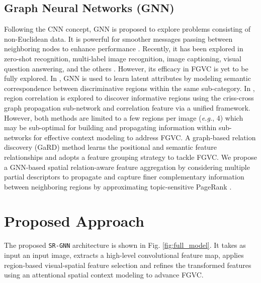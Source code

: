 \documentclass[journal]{IEEEtran}
\begin{document}
\subsection {Graph Neural Networks (GNN)} 
Following the CNN concept, GNN is proposed to explore problems consisting of non-Euclidean data. It is powerful for smoother messages passing between neighboring nodes to enhance performance \cite{kipf2016semi}. Recently, it has been explored in zero-shot recognition, multi-label image recognition, image captioning, visual question answering, and the others \cite{wu2020comprehensive}. However, its efficacy in FGVC is yet to be fully explored. In \cite{wang2020category}, GNN is used to learn latent attributes by modeling semantic correspondence between discriminative regions within the same sub-category. In  \cite{wang2020graph}, region correlation is explored to discover informative regions using the criss-cross graph propagation sub-network and correlation feature via a unified framework. However, both methods are limited to a few regions per image (\textit{e.g.}, 4) which may be sub-optimal for building and propagating information within sub-networks for effective context modeling to address FGVC. A graph-based relation discovery (GaRD) method \cite {zhao2021graph} learns the positional and semantic feature relationships and adopts a feature grouping strategy to tackle FGVC. We propose a GNN-based spatial relation-aware feature aggregation by considering multiple partial descriptors to propagate and capture finer complementary information between neighboring regions by approximating topic-sensitive PageRank \cite{klicpera2018predict}.  
\section{Proposed Approach} \label{proposed}
The proposed \texttt{SR-GNN} architecture is shown in Fig. \ref{fig:full_model}. It takes as input an input image, extracts a high-level convolutional feature map, applies region-based visual-spatial feature selection and refines the transformed features using an attentional spatial context modeling to advance FGVC. 
\vspace{-0.2 cm}
\end{document}
